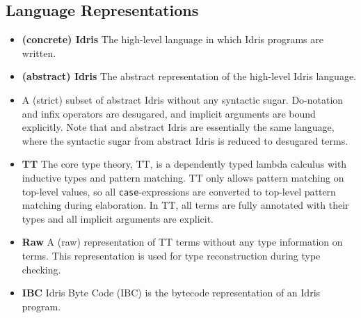 \subsection{Language Representations}
\begin{itemize}
\item \textbf{(concrete) Idris}
The high-level language in which Idris programs are written.
\item \textbf{(abstract) Idris}
The abstract representation of the high-level Idris language.
\item \textbf{\IdrisM}
A (strict) subset of abstract Idris without any syntactic sugar. Do-notation and infix operators
are desugared, and implicit arguments are bound explicitly. Note that
\IdrisM and abstract Idris are essentially the same language, where the
syntactic sugar from abstract Idris is reduced to desugared terms.
\item \textbf{TT}
The core type theory, TT, is a dependently typed lambda calculus with inductive
types and pattern matching. TT only allows pattern matching on top-level values,
so all \texttt{case}-expressions are converted to top-level pattern matching
during elaboration. In TT, all terms are fully annotated with their types and
all implicit arguments are explicit.
\item \textbf{Raw}
A (raw) representation of TT terms without any type information on terms. This
representation is used for type reconstruction during type checking.
\item \textbf{IBC}
Idris Byte Code (IBC) is the bytecode representation of an Idris program.
\end{itemize}

